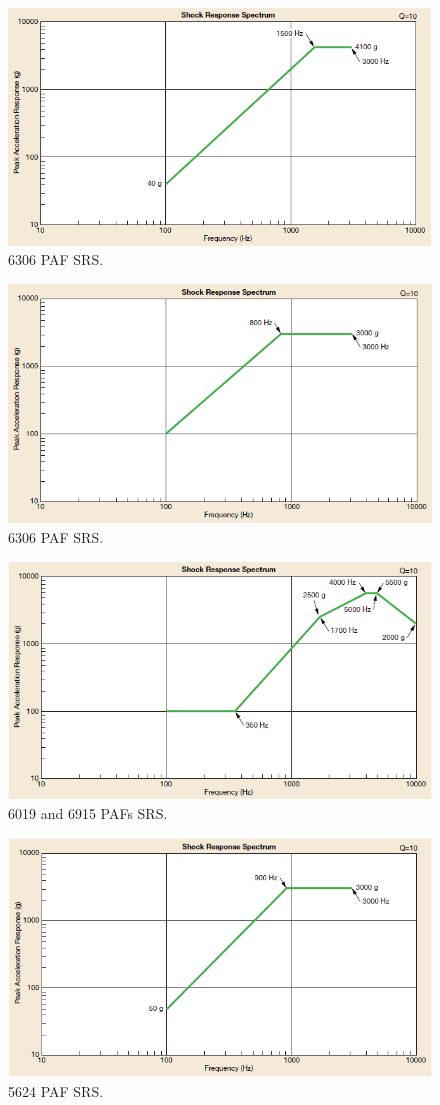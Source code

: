 \documentclass[paper=letter, fontsize=11pt]{scrartcl} %
\numberwithin{equation}{section} %
\numberwithin{figure}{section} %
\numberwithin{table}{section} %
\begin{document}
\begin{figure}[H]
    \begin{center}
    \includegraphics[width=.75\textwidth]{SS13_Shock_PAF/13-1.png}
    \caption{6306 PAF SRS.}
    \label{fig:13.1}
    \end{center}
\end{figure}

\begin{figure}[H]
    \begin{center}
    \includegraphics[width=.55\textwidth]{SS13_Shock_PAF/13-2.png}
    \caption{6306 PAF SRS.}
    \label{fig:13.2}
    \end{center}
\end{figure}

\begin{figure}[H]
    \begin{center}
    \includegraphics[width=.55\textwidth]{SS13_Shock_PAF/13-3.png}
    \caption{6019 and 6915 PAFs SRS.}
    \label{fig:13.3}
    \end{center}
\end{figure}

\begin{figure}[H]
    \begin{center}
    \includegraphics[width=.55\textwidth]{SS13_Shock_PAF/13-4.png}
    \caption{5624 PAF SRS.}
    \label{fig:13.4}
    \end{center}
\end{figure}
\end{document}
